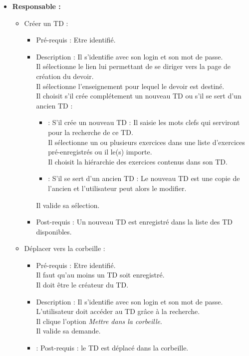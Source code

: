 	\begin{itemize}
	\item {\bf Responsable :}\\
		\begin{itemize}
		\item Cr{\'e}er un TD :
			\begin{itemize}
			\item Pr{\'e}-requis : Etre identifi{\'e}.
			\item Description : Il s'identifie avec son login et son mot de passe.\\
			Il s{\'e}lectionne le lien lui permettant de se diriger vers la page de cr{\'e}ation du devoir.\\
			Il s{\'e}lectionne l'enseignement pour lequel le devoir est destin{\'e}.\\
			Il choisit s'il cr{\'e}e compl{\'e}tement un nouveau TD ou s'il se sert d'un ancien TD :
			\begin{itemize}
				\item : S'il cr{\'e}e un nouveau TD : Il saisie les mots clefs qui serviront pour la recherche de ce TD.\\
				Il s{\'e}lectionne un ou plusieurs exercices dans une liste d'exercices pr{\'e}-enregistr{\'e}s ou il le(s) importe.\\
				Il choisit la hi{\'e}rarchie des exercices contenus dans son TD.
				\item : S'il se sert d'un ancien TD : Le nouveau TD est une copie de l'ancien et l'utilisateur peut alors le modifier.
			\end{itemize}
			Il valide sa s{\'e}lection.
			\item Post-requis : Un nouveau TD est enregistr{\'e} dans la liste des TD disponibles.\\
			\end{itemize}

		\item D{\'e}placer vers la corbeille :
			\begin{itemize}
			\item Pr{\'e}-requis : Etre identifi{\'e}.\\
			Il faut qu'au moins un TD soit enregistr{\'e}.\\
			Il doit {\^e}tre le cr{\'e}ateur du TD.
			\item Description : Il s'identifie avec son login et son mot de passe.\\
			L'utilisateur doit acc{\'e}der au TD gr{\^a}ce {\`a} la recherche.\\
			Il clique l'option {\it Mettre dans la corbeille}.\\
			Il valide sa demande.
			\item : Post-requis : le TD est d{\'e}plac{\'e} dans la corbeille.\\
			\end{itemize}

		\end{itemize}
	\end{itemize}


